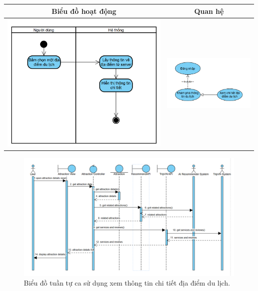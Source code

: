 \noindent 
\begin{tabular}{| c | c |}
    \hline
    \textbf{Biểu đồ hoạt động} & \textbf{Quan hệ} \\ 
    \hline
    \includegraphics[width=0.5\linewidth]{figures/c3/3-3-8-ad.png} 
    & 
    \includegraphics[width=0.45\linewidth]{figures/c3/3-3-8-rd.png} \\ 
    \hline
\end{tabular}


\vspace{0.8cm}

\begin{figure}[H]
    \centering  
    \includegraphics[width=1\textwidth]{figures/c3/3-3-8-sd.png}
    \caption{Biểu đồ tuần tự ca sử dụng xem thông tin chi tiết địa điểm du lịch.}
    \label{fig:3-3-8-sequence-diagram}
\end{figure}